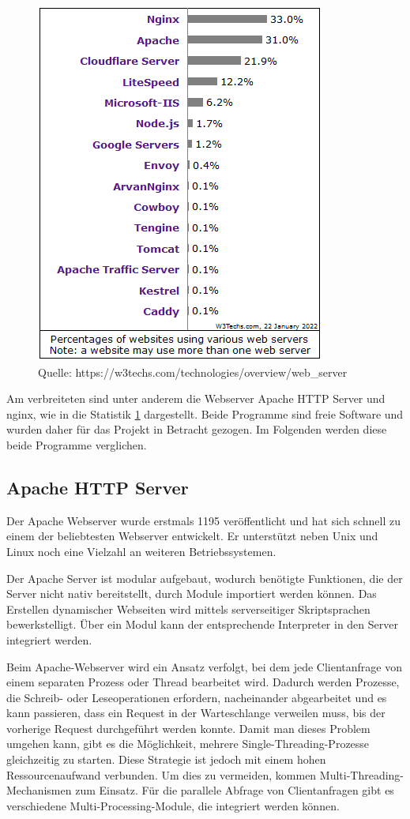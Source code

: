 \begin{figure}[htbp]
	\centering
	\includegraphics{images/StatistikWebserver.png}
	\caption{Quelle: https://w3techs.com/technologies/overview/web\_server}
	\label{fig:WebserverStatistik}
\end{figure}

Am verbreiteten sind unter anderem die Webserver Apache HTTP Server und nginx, wie in die Statistik \ref{fig:WebserverStatistik} dargestellt. Beide Programme sind freie Software und wurden daher für das Projekt in Betracht gezogen. Im Folgenden werden diese beide Programme verglichen.


\subsection{Apache HTTP Server}
Der Apache Webserver wurde erstmals 1195 veröffentlicht und hat sich schnell zu einem der beliebtesten Webserver entwickelt. Er unterstützt neben Unix und Linux noch eine Vielzahl an weiteren Betriebssystemen.

Der Apache Server ist modular aufgebaut, wodurch benötigte Funktionen, die der Server nicht nativ bereitstellt, durch Module importiert werden können. Das Erstellen dynamischer Webseiten wird mittels serverseitiger Skriptsprachen bewerkstelligt. Über ein Modul kann der entsprechende Interpreter in den Server integriert werden.

Beim Apache-Webserver wird ein Ansatz verfolgt, bei dem jede Clientanfrage von einem separaten Prozess oder Thread bearbeitet wird. Dadurch werden Prozesse, die Schreib- oder Leseoperationen erfordern, nacheinander abgearbeitet und es kann passieren, dass ein Request in der Warteschlange verweilen muss, bis der vorherige Request durchgeführt werden konnte. Damit man dieses Problem umgehen kann, gibt es die Möglichkeit, mehrere Single-Threading-Prozesse gleichzeitig zu starten. Diese Strategie ist jedoch mit einem hohen Ressourcenaufwand verbunden. Um dies zu vermeiden, kommen Multi-Threading-Mechanismen zum Einsatz. Für die parallele Abfrage von Clientanfragen gibt es verschiedene Multi-Processing-Module, die integriert werden können.



